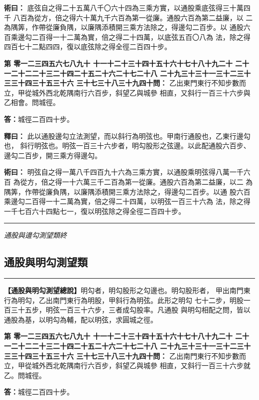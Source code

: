 \documentclass[11pt,a4paper]{article}
\newcommand{\longline}{\noindent\rule{\textwidth}{0.4pt}}
\newcounter{probnum}
\newcommand{\chnum}[1]{%
  \ifcase#1 零\or 一\or 二\or 三\or 四\or 五\or 六\or 七\or 八\or 九\or 十\or
    十一\or 十二\or 十三\or 十四\or 十五\or 十六\or 十七\or 十八\or 十九\or 二十\or
    二十一\or 二十二\or 二十三\or 二十四\or 二十五\or 二十六\or 二十七\or 二十八\or
    二十九\or 三十\or 三十一\or 三十二\or 三十三\or 三十四\or 三十五\or 三十六\or
    三十七\or 三十八\or 三十九\or 四十\fi}
\newcommand{\problem}[1]{\stepcounter{probnum}\par\noindent\textbf{第\chnum{\value{probnum}}問：}#1\par}
\newcommand{\answer}[1]{\par\noindent\textbf{答：}#1\par}
\newcommand{\shiyi}[1]{\par\noindent\textbf{釋曰：}#1\par}
\newcommand{\shuyue}[1]{\par\noindent\textbf{術曰：}#1\par}
\begin{document}
\shuyue{
底弦自之得二十五萬八千〇六十四為三乘方實，以通股乘底弦得三十萬四千
八百為從方，倍之得六十萬九千六百為第一從廉。通股六百為第二益廉，以
二為隅筭，作帶從廉負隅，以廉隅添積開三乘方法除之，得邊勾二百步。以
通股六百乘邊勾二百得一十二萬為實，倍之得二十四萬，以底弦五百〇八為
法，除之得四百七十二點四四，復以底弦除之得全徑二百四十步。
}

\vspace{0.3cm}
\problem{
乙出東門東行不知步數而立，甲從城外西北乾隅南行六百步，斜望乙與城參
相直，又斜行一百三十六步與乙相會。問城徑。
}

\answer{城徑二百四十步。}

\shiyi{
此以通股邊勾立法測望，而以斜行為明弦也。甲南行通股也，乙東行邊勾也，
斜行明弦也。明弦一百三十六步者，明勾股形之弦邊。以此配通股六百步、
邊勾二百步，開三乘方得邊勾。
}

\shuyue{
明弦自之得一萬八千四百九十六為三乘方實，以通股乘明弦得八萬一千六百
為從方，倍之得一十六萬三千二百為第一從廉。通股六百為第二益廉，以二
為隅筭，作帶從廉負隅，以廉隅添積開三乘方法除之，得邊勾二百步。以通
股六百乘邊勾二百得一十二萬為實，倍之得二十四萬，以明弦一百三十六為
法，除之得一千七百六十四點七一，復以明弦除之得全徑二百四十步。
}

\vspace{0.5cm}
\longline
\begin{center}
\textit{通股與邊勾測望類終}
\end{center}

\newpage
\setcounter{probnum}{0}

\subsection*{通股與明勾測望類}
\vspace{0.3cm}
\longline
\vspace{0.3cm}

\noindent
\textbf{【通股與明勾測望總說】}明勾者，明勾股形之勾邊也。明勾股形者，
甲出南門東行為明勾，乙出南門東行為明股，甲斜行為明弦。此形之明勾
七十二步，明股一百三十五步，明弦一百三十六步，三者成勾股率。凡通股
與明勾相配之問，皆以通股為基，以明勾為輔，配以明弦，求圓城之徑。

\problem{
乙出南門東行不知步數而立，甲從城外西北乾隅南行六百步，斜望乙與城參
相直，又斜行一百三十六步就乙。問城徑。
}

\answer{城徑二百四十步。}
\end{document}
